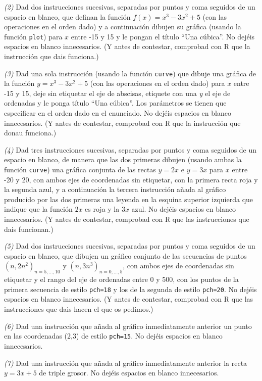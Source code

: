 \documentclass[
]{book}
\theoremstyle{definition}
\theoremstyle{definition}
\theoremstyle{definition}
\theoremstyle{remark}
\begin{document}
\emph{(2)} Dad dos instrucciones sucesivas, separadas por puntos y coma seguidos de un espacio en blanco, que definan la función \(f(x)=x^3-3x^2+5\) (con las operaciones en el orden dado) y a continuación dibujen su gráfica (usando la función \texttt{plot}) para \(x\) entre -15 y 15 y le pongan el título ``Una cúbica''. No dejéis espacios en blanco innecesarios. (Y antes de contestar, comprobad con R que la instrucción que dais funciona.)

\emph{(3)} Dad una sola instrucción (usando la función \texttt{curve}) que dibuje una gráfica de la función \(y=x^3-3x^2+5\) (con las operaciones en el orden dado) para \(x\) entre -15 y 15, deje sin etiquetar el eje de abscisas, etiquete con una \emph{y} el eje de ordenadas y le ponga título ``Una cúbica''. Los parámetros se tienen que especificar en el orden dado en el enunciado. No dejéis espacios en blanco innecesarios. (Y antes de contestar, comprobad con R que la instrucción que donau funciona.)

\emph{(4)} Dad tres instrucciones sucesivas, separadas por puntos y coma seguidos de un espacio en blanco, de manera que las dos primeras dibujen (usando ambas la función \texttt{curve}) una gráfica conjunta de las rectas \(y=2x\) e \(y=3x\) para \(x\) entre -20 y 20, con ambos ejes de coordenadas sin etiquetar, con la primera recta roja y la segunda azul, y a continuación la tercera instrucción añada al gráfico producido por las dos primeras una leyenda en la esquina superior izquierda que indique que la función \(2x\) es roja y la \(3x\) azul. No dejéis espacios en blanco innecesarios. (Y antes de contestar, comprobad con R que las instrucciones que dais funcionan.)

\emph{(5)} Dad dos instrucciones sucesivas, separadas por puntos y coma seguidos de un espacio en blanco, que dibujen un gráfico conjunto de las secuencias de puntos \((n,2n^2)_{n=5,\ldots,10}\) y \((n,3n^3)_{n=0,\ldots,5}\), con ambos ejes de coordenadas sin etiquetar y el rango del eje de ordenadas entre 0 y 500, con los puntos de la primera secuencia de estilo \texttt{pch=18} y los de la segunda de estilo \texttt{pch=20}. No dejéis espacios en blanco innecesarios. (Y antes de contestar, comprobad con R que las instrucciones que dais hacen el que os pedimos.)

\emph{(6)} Dad una instrucción que añada al gráfico inmediatamente anterior un punto en las coordenadas (2,3) de estilo \texttt{pch=15}. No dejéis espacios en blanco innecesarios.

\emph{(7)} Dad una instrucción que añada al gráfico inmediatamente anterior la recta \(y=3x+5\) de triple grosor. No dejéis espacios en blanco innecesarios.
\end{document}
